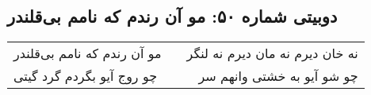 \begin{center}
\section*{دوبیتی شماره ۵۰: مو آن رندم که نامم بی‌قلندر}
\label{sec:050}
\begin{longtable}{l p{0.5cm} r}
مو آن رندم که نامم بی‌قلندر
&&
نه خان دیرم نه مان دیرم نه لنگر
\\
چو روج آیو بگردم گرد گیتی
&&
چو شو آیو به خشتی وانهم سر
\\
\end{longtable}
\end{center}
